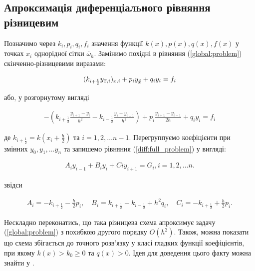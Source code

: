 \subsection{Апроксимація диференціального рівняння різницевим} \label{ssec:approx}

Позначимо через \( k_i, p_i, q_i, f_i \) значення функції \( k(x), p(x), q(x), f(x)\) у точках \( x_i \) однорідної сітки \( \overline{\omega}_h \). Замінимо похідні в рівняння (\ref{global:problem}) скінченно-різницевими виразами:

\begin{equation}
\begin{multlined} \label{diff:compact_problem}
(k_{i+\frac{1}{2}} y_{\overline{x}, i})_{x, i} + p_i y_{\accentset{\circ}{x}} + q_iy_i = f_i
\end{multlined}
\end{equation}

або, у розгорнутому вигляді

\begin{equation}
\begin{multlined} \label{diff:full_problem}
-\left( k_{i+\frac{1}{2}} \frac{y_{i+1} - y_i}{h^2} - k_{i-\frac{1}{2}} \frac{y_i - y_{i-1}}{h^2}\right) + p_i \frac{y_{i+1} - y_{i-1}}{2h} + q_iy_i = f_i
\end{multlined}
\end{equation}

де \( k_{i+\frac{1}{2}} = k(x_i + \frac{h}{2})\) та \( i = 1, 2, \dots n-1 \). Перегруппуємо коєфіцієнти при змінних \( y_0, y_1, \dots y_n\) та запишемо рівняння (\ref{diff:full_problem}) у вигляді:

\begin{equation}
\begin{multlined} \label{diff:general_form}
A_iy_{i-1} + B_iy_i + Ciy_{i+1} = G_i, i = 1, 2, \dots n.
\end{multlined}
\end{equation}

звідси

\begin{equation}
\begin{multlined} \label{diff:grouped}
A_i = -k_{i+\frac{1}{2}} - \frac{h}{2}p_i, \quad B_i = k_{i+\frac{1}{2}} + k_{i - \frac{1}{2}} + h^2q_i, \quad C_i = -k_{i+\frac{1}{2}} + \frac{h}{2}p_i.
\end{multlined}
\end{equation}

Нескладно переконатись, що така різницева схема апроксимує задачу (\ref{global:problem}) з похибкою другого порядку \( O(h^2)\). Також, можна показати що схема збігається до точного розв'язку у класі гладких функції коефіцієнтів, при якому \(k(x) > k_0 \geq 0\) та \(q(x) > 0\). Ідея для доведення цього факту можна знайти у \cite[с. 106--108]{Samarskii71}.

